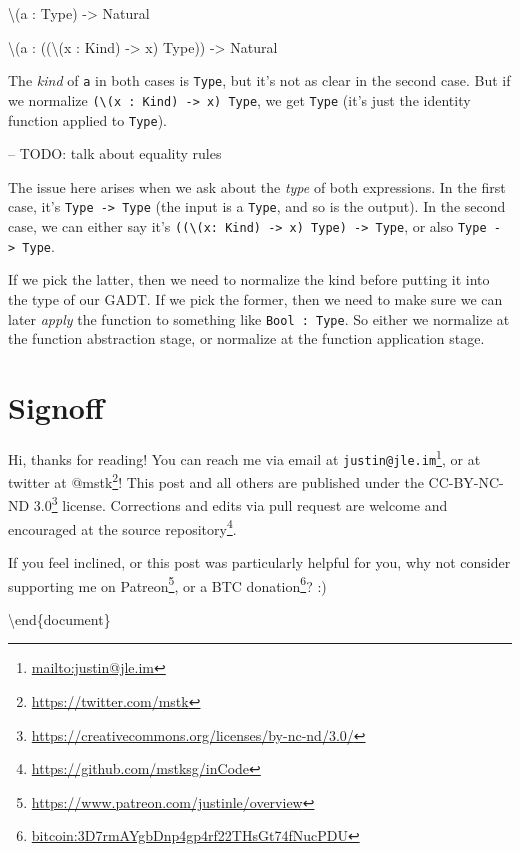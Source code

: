 \documentclass[]{article}
\newenvironment{Shaded}{}{}
\newcommand{\DataTypeTok}[1]{\textcolor[rgb]{0.56,0.13,0.00}{#1}}
\newcommand{\NormalTok}[1]{#1}
\newcommand{\OperatorTok}[1]{\textcolor[rgb]{0.40,0.40,0.40}{#1}}
\newcommand{\OtherTok}[1]{\textcolor[rgb]{0.00,0.44,0.13}{#1}}
\renewcommand{\href}[2]{#2\footnote{\url{#1}}}
\begin{document}
\begin{Shaded}
\begin{Highlighting}[]
\NormalTok{\textbackslash{}(a }\OperatorTok{:} \DataTypeTok{Type}\NormalTok{) }\OtherTok{{-}\textgreater{}} \DataTypeTok{Natural}

\NormalTok{\textbackslash{}(a }\OperatorTok{:}\NormalTok{ ((\textbackslash{}(x }\OperatorTok{:} \DataTypeTok{Kind}\NormalTok{) }\OtherTok{{-}\textgreater{}}\NormalTok{ x) }\DataTypeTok{Type}\NormalTok{)) }\OtherTok{{-}\textgreater{}} \DataTypeTok{Natural}
\end{Highlighting}
\end{Shaded}

The \emph{kind} of \texttt{a} in both cases is \texttt{Type}, but it's not as
clear in the second case. But if we normalize
\texttt{(\textbackslash{}(x\ :\ Kind)\ -\textgreater{}\ x)\ Type}, we get
\texttt{Type} (it's just the identity function applied to \texttt{Type}).

-- TODO: talk about equality rules

The issue here arises when we ask about the \emph{type} of both expressions. In
the first case, it's \texttt{Type\ -\textgreater{}\ Type} (the input is a
\texttt{Type}, and so is the output). In the second case, we can either say it's
\texttt{((\textbackslash{}(x:\ Kind)\ -\textgreater{}\ x)\ Type)\ -\textgreater{}\ Type},
or also \texttt{Type\ -\textgreater{}\ Type}.

If we pick the latter, then we need to normalize the kind before putting it into
the type of our GADT. If we pick the former, then we need to make sure we can
later \emph{apply} the function to something like \texttt{Bool\ :\ Type}. So
either we normalize at the function abstraction stage, or normalize at the
function application stage.

\section{Signoff}\label{signoff}

Hi, thanks for reading! You can reach me via email at
\href{mailto:justin@jle.im}{\nolinkurl{justin@jle.im}}, or at twitter at
\href{https://twitter.com/mstk}{@mstk}! This post and all others are published
under the \href{https://creativecommons.org/licenses/by-nc-nd/3.0/}{CC-BY-NC-ND
3.0} license. Corrections and edits via pull request are welcome and encouraged
at \href{https://github.com/mstksg/inCode}{the source repository}.

If you feel inclined, or this post was particularly helpful for you, why not
consider \href{https://www.patreon.com/justinle/overview}{supporting me on
Patreon}, or a \href{bitcoin:3D7rmAYgbDnp4gp4rf22THsGt74fNucPDU}{BTC donation}?
:)

\textbackslash end\{document\}
\end{document}
